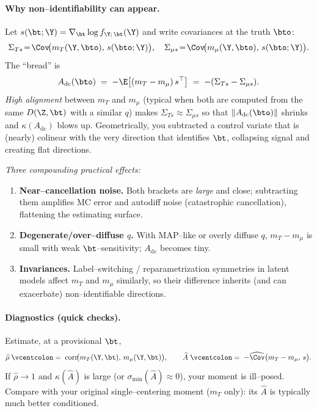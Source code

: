 \paragraph{Why non–identifiability can appear.}
Let $s(\bt;\Y)=\nabla_\bt\log f_{\Y;\,\bt}(\Y)$ and write covariances at the truth $\bto$:
\[
\Sigma_{Ts}\!=\!\Cov\!\big(m_T(\Y,\bto),\,s(\bto;\Y)\big),\quad
\Sigma_{\mu s}\!=\!\Cov\!\big(m_\mu(\Y,\bto),\,s(\bto;\Y)\big).
\]
The “bread” is
\[
A_{\mathrm{dc}}(\bto)\;=\;-\E\!\left[(m_T-m_\mu)\,s^\top\right]
\;=\;-(\Sigma_{Ts}-\Sigma_{\mu s}).
\]
\emph{High alignment} between $m_T$ and $m_\mu$ (typical when both are computed from the same $D(\Z,\bt)$ with a similar $q$) makes $\Sigma_{Ts}\approx\Sigma_{\mu s}$ so that $\|A_{\mathrm{dc}}(\bto)\|$ shrinks and $\kappa(A_{\mathrm{dc}})$ blows up. Geometrically, you subtracted a control variate that is (nearly) colinear with the very direction that identifies $\bt$, collapsing signal and creating flat directions.

\emph{Three compounding practical effects:}
\begin{enumerate}
\item \textbf{Near–cancellation noise.} Both brackets are \emph{large} and close; subtracting them amplifies MC error and autodiff noise (catastrophic cancellation), flattening the estimating surface.
\item \textbf{Degenerate/over–diffuse $q$.} With MAP–like or overly diffuse $q$, $m_T-m_\mu$ is small with weak $\bt$–sensitivity; $A_{\mathrm{dc}}$ becomes tiny.
\item \textbf{Invariances.} Label–switching / reparametrization symmetries in latent models affect $m_T$ and $m_\mu$ similarly, so their difference inherits (and can exacerbate) non–identifiable directions.
\end{enumerate}

\paragraph{Diagnostics (quick checks).}
Estimate, at a provisional $\bt$,
\[
\widehat\rho\;\vcentcolon=\;\mathrm{corr}\!\big(m_T(\Y,\bt),\,m_\mu(\Y,\bt)\big),\qquad
\widehat A\;\vcentcolon=\;-\widehat{\Cov}\big(m_T-m_\mu,\,s\big).
\]
If $\widehat\rho\to 1$ and $\kappa(\widehat A)$ is large (or $\sigma_{\min}(\widehat A)\approx 0$), your moment is ill–posed. Compare with your original single–centering moment ($m_T$ only): its $\widehat A$ is typically much better conditioned.

